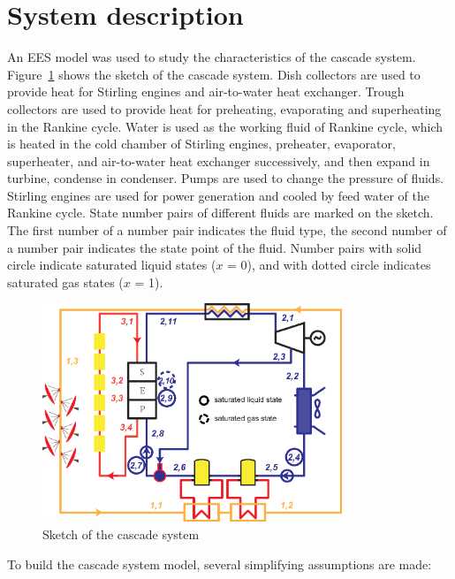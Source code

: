 \documentclass{article}
\begin{document}
\section{System description}
An EES model was used to study the characteristics of the cascade system. Figure~\ref{fig:System-1} shows the sketch of the cascade system. Dish collectors are used to provide heat for Stirling engines and air-to-water heat exchanger. Trough collectors are used to provide heat for preheating, evaporating and superheating in the Rankine cycle. Water is used as the working fluid of Rankine cycle, which is heated in the cold chamber of Stirling engines, preheater, evaporator, superheater, and air-to-water heat exchanger successively, and then expand in turbine, condense in condenser. Pumps are used to change the pressure of fluids. Stirling engines are used for power generation and cooled by feed water of the Rankine cycle. State number pairs of different fluids are marked on the sketch. The first number of a number pair indicates the fluid type, the second number of a number pair indicates the state point of the fluid. Number pairs with solid circle indicate saturated liquid states ($x$ = 0), and with dotted circle indicates saturated gas states ($x$ = 1).

\noindent \begin{figure}[htbp]
\begin{center}
	\includegraphics[width = 0.8\textwidth]{./graphics/cascadeSystem}
	\caption{Sketch of the cascade system}
	\label{fig:System-1}
\end{center}
\end{figure}

To build the cascade system model, several simplifying assumptions are made:
\end{document}
